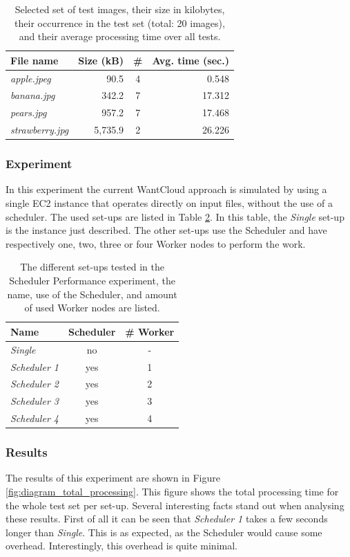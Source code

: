 \documentclass{acm_proc_article-sp}
\begin{document}
\begin{table}
	\centering
	\begin{tabular}{| l | r | c | r |}
		\hline
		File name & Size (kB) & \# & Avg. time (sec.) \\ \hline \hline
		\emph{apple.jpeg} & 90.5 & 4 & 0.548 \\ \hline
		\emph{banana.jpg} & 342.2 & 7 & 17.312 \\ \hline
		\emph{pears.jpg} & 957.2 & 7 & 17.468 \\ \hline
		\emph{strawberry.jpg} & 5,735.9 & 2 & 26.226 \\ \hline
	\end{tabular}
	\caption{Selected set of test images, their size in kilobytes, their occurrence in the test set (total: 20 images), and their average processing time over all tests.}
	\label{tbl:tasks}
\end{table}

\subsubsection{Experiment}
In this experiment the current WantCloud approach is simulated by using a single EC2 instance that operates directly on input files, without the use of a scheduler.
The used set-ups are listed in Table \ref{tbl:setups}.
In this table, the \emph{Single} set-up is the instance just described.
The other set-ups use the Scheduler and have respectively one, two, three or four Worker nodes to perform the work. 

\begin{table}
	\centering
	\begin{tabular}{| l | c | c |}
		\hline
		Name & Scheduler & \# Worker \\ \hline \hline
		\emph{Single} & no & - \\ \hline
		\emph{Scheduler 1} & yes & 1 \\ \hline
		\emph{Scheduler 2} & yes & 2 \\ \hline
		\emph{Scheduler 3} & yes & 3 \\ \hline
		\emph{Scheduler 4} & yes & 4 \\ \hline
	\end{tabular}
	\caption{The different set-ups tested in the Scheduler Performance experiment, the name, use of the Scheduler, and amount of used Worker nodes are listed.}
	\label{tbl:setups}
\end{table}

\subsubsection{Results}
The results of this experiment are shown in Figure \ref{fig:diagram_total_processing}.
This figure shows the total processing time for the whole test set per set-up.
Several interesting facts stand out when analysing these results.
First of all it can be seen that \emph{Scheduler 1} takes a few seconds longer than \emph{Single}.
This is as expected, as the Scheduler would cause some overhead.
Interestingly, this overhead is quite minimal.
\end{document}
